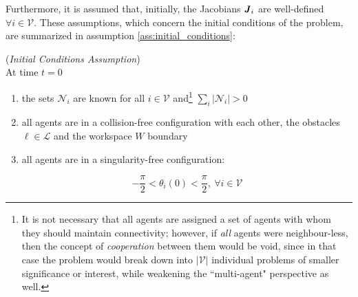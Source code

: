 Furthermore, it is assumed that, initially, the Jacobians $\bm{\mathit{J}}_i$ are
well-defined $\forall i \in \mathcal{V}$. These assumptions, which concern
the initial conditions of the problem, are summarized in assumption
\ref{ass:initial_conditions}:

\begin{gg_box}
\begin{assumption}(\textit{Initial Conditions Assumption})\\

  At time $t = 0$

  \begin{enumerate}

    \item the sets $\mathcal{N}_i$ are known for all $i \in \mathcal{V}$
      and\footnote{It is not necessary that
      all agents are assigned a set of agents with whom they should maintain
      connectivity; however, if \textit{all} agents were neighbour-less,
      then the concept of \textit{cooperation} between them would be void,
      since in that case the problem would break down into $|\mathcal{V}|$
      individual problems of smaller significance or interest, while
      weakening the ``multi-agent" perspective as well.}
      $\sum\limits_i |\mathcal{N}_i| > 0$

    \item all agents are in a collision-free configuration with each other,
      the obstacles $\ell \in \mathcal{L}$ and the workspace $W$ boundary

    \item all agents are in a singularity-free configuration:

      $$ -\frac{\pi}{2} < \theta_i(0) < \frac{\pi}{2},\ \forall i \in \mathcal{V}$$

  \end{enumerate}
  \label{ass:initial_conditions}
\end{assumption}
\end{gg_box}
